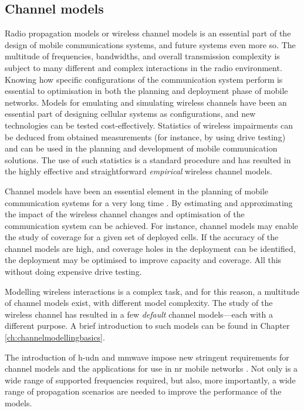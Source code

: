 \subsection{Channel models}

Radio propagation models or wireless channel models is an essential part of the design of mobile communications systems, and future systems even more so. The multitude of frequencies, bandwidths, and overall transmission complexity is subject to many different and complex interactions in the radio environment. Knowing how specific configurations of the communication system perform is essential to optimisation in both the planning and deployment phase of mobile networks. Models for emulating and simulating wireless channels have been an essential part of designing cellular systems as configurations, and new technologies can be tested cost-effectively. Statistics of wireless impairments can be deduced from obtained measurements (for instance, by using drive testing) and can be used in the planning and development of mobile communication solutions. The use of such statistics is a standard procedure and has resulted in the highly effective and straightforward \emph{empirical} wireless channel models. 

Channel models have been an essential element in the planning of mobile communication systems for a very long time \cite{Taufique2017, Cavalcanti2017}. By estimating and approximating the impact of the wireless channel changes and optimisation of the communication system can be achieved. For instance, channel models may enable the study of coverage for a given set of deployed cells. If the accuracy of the channel models are high, and coverage holes in the deployment can be identified, the deployment may be optimised to improve capacity and coverage. All this without doing expensive drive testing.

Modelling wireless interactions is a complex task, and for this reason, a multitude of channel models exist, with different model complexity. The study of the wireless channel has resulted in a few \emph{default} channel models—each with a different purpose. A brief introduction to such models can be found in Chapter \ref{ch:channelmodellingbasics}.

The introduction of \gls{h-udn} and \gls{mmwave} impose new stringent requirements for channel models and the applications for use in \gls{nr} mobile networks 
\cite{Wang2018}. Not only is a wide range of supported frequencies required, but also, more importantly, a wide range of propagation scenarios are needed to improve the performance of the models. 

